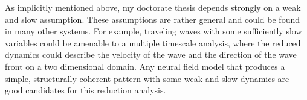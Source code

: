 \documentclass[a4paper,11pt]{article}
\begin{document}
As implicitly mentioned above, my doctorate thesis depends strongly on a weak and slow assumption. These assumptions are rather general and could be found in many other systems. For example, traveling waves with some sufficiently slow variables could be amenable to a multiple timescale analysis, where the reduced dynamics could describe the velocity of the wave and the direction of the wave front on a two dimensional domain. Any neural field model that produces a simple, structurally coherent pattern with some weak and slow dynamics are good candidates for this reduction analysis.




\end{document}
